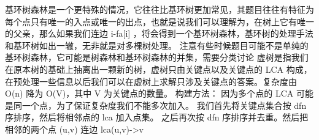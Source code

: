 {}\markdownRendererSectionBegin
{}\markdownRendererInterblockSeparator
{}\markdownRendererInterblockSeparator
{}基环树森林是一个更特殊的情况，它往往比基环树更加常见，其题目往往有特征为每个点只有唯一的入点或唯一的出点，也就是说我们可以理解为，在树上它有唯一的父亲，那么如果我们连边\markdownRendererDollarSign{} i-fa[i] \markdownRendererDollarSign{}，将会得到一个基环树森林，基环树的处理手法和基环树如出一辙，无非就是对多棵树处理。\markdownRendererParagraphSeparator
{}注意有些时候题目可能不是单纯的基环树森林，它可能是树森林和基环树森林的并集，需要分类讨论\markdownRendererInterblockSeparator
{}
\markdownRendererSectionEnd \markdownRendererSectionBegin
{}\markdownRendererInterblockSeparator
{}\markdownRendererInterblockSeparator
{}
\markdownRendererSectionEnd 
\markdownRendererSectionEnd \markdownRendererSectionBegin
{}\markdownRendererInterblockSeparator
{}虚树是指我们在原本树的基础上抽离出一颗新的树，虚树只由关键点以及关键点的 \markdownRendererDollarSign{}LCA\markdownRendererDollarSign{} 构成，在预处理一些信息以后我们可以在虚树上求解只涉及关键点的答案。复杂度由 \markdownRendererDollarSign{}O(n)\markdownRendererDollarSign{} 降为 \markdownRendererDollarSign{}O(V)\markdownRendererDollarSign{}，其中 \markdownRendererDollarSign{}V\markdownRendererDollarSign{} 为关键点的数量。\markdownRendererParagraphSeparator
{}构建方法：\markdownRendererParagraphSeparator
{}因为多个点的\markdownRendererDollarSign{} LCA \markdownRendererDollarSign{}可能是同一个点，为了保证复杂度我们不能多次加入。\markdownRendererParagraphSeparator
{}我们首先将关键点集合按\markdownRendererDollarSign{} dfn \markdownRendererDollarSign{}序排序，然后将相邻点的\markdownRendererDollarSign{} lca \markdownRendererDollarSign{}加入点集。\markdownRendererParagraphSeparator
{}之后再次按\markdownRendererDollarSign{} dfn \markdownRendererDollarSign{}序排序并去重。然后把相邻的两个点\markdownRendererDollarSign{} (u,v) \markdownRendererDollarSign{}连边\markdownRendererDollarSign{} lca(u,v)->v \markdownRendererDollarSign{}\markdownRendererInterblockSeparator
{}\markdownRendererInterblockSeparator
{}
\markdownRendererSectionEnd \markdownRendererSectionBegin
{}\markdownRendererInterblockSeparator
